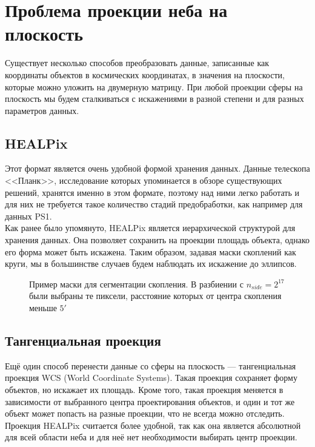 \chapter{Проблема проекции неба на плоскость}
\label{cha:ch_4}

Существует несколько способов преобразовать данные, записанные как координаты объектов в космических
координатах, в значения на плоскости, которые можно уложить на двумерную матрицу. При любой проекции 
сферы на плоскость мы будем сталкиваться с искажениями в разной степени и для разных параметров данных.

\section{HEALPix}
Этот формат является очень удобной формой хранения данных. Данные телескопа <<Планк>>, исследование
которых упоминается в обзоре существующих решений, хранятся именно в этом формате, поэтому над ними 
легко работать и для них не требуется такое количество стадий предобработки, как например для данных 
PS1. \\

Как ранее было упомянуто, HEALPix является иерархической структурой для хранения данных. Она 
позволяет сохранить на проекции площадь объекта, однако его форма может быть искажена. Таким образом,
задавая маски скоплений как круги, мы в большинстве случаев будем наблюдать их искажение до эллипсов.\\

\begin{figure}
    \caption{Пример маски для сегментации скопления. В разбиении с $n_{side} = 2^{17}$ были выбраны
        те пиксели, расстояние которых от центра скопления меньше $5'$}
\end{figure}

\section{Тангенциальная проекция}
Ещё один способ перенести данные со сферы на плоскость --- тангенциальная проекция WCS (World 
Coordinate Systems). Такая проекция сохраняет форму объектов, но искажает их площадь. Кроме того, 
такая проекция меняется в зависимости от выбранного центра проектирования объектов, и один и тот же
объект может попасть на разные проекции, что не всегда можно отследить. \\

Проекция HEALPix считается более удобной, так как она является абсолютной для всей области неба и 
для неё нет необходимости выбирать центр проекции.\\
